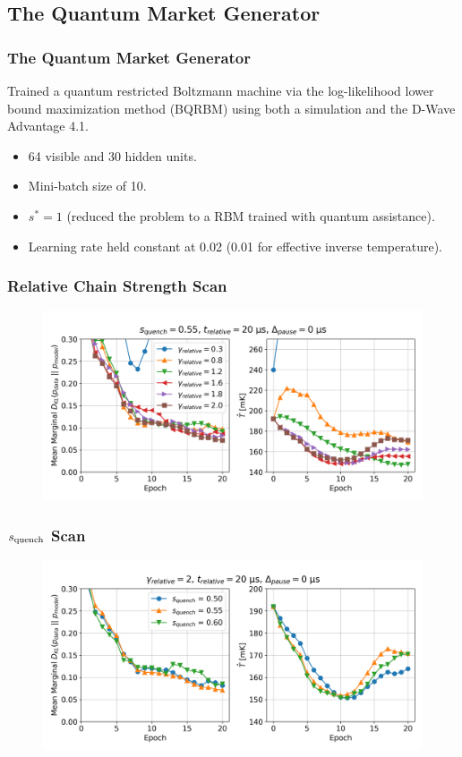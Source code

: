 \documentclass{beamer}
\begin{document}
\subsection{The Quantum Market Generator}
\begin{frame}
    \frametitle{The Quantum Market Generator}
    Trained a quantum restricted Boltzmann machine via the log-likelihood lower bound maximization method (BQRBM) using both a simulation and the D-Wave Advantage 4.1.
    \begin{itemize}
        \item 64 visible and 30 hidden units.
        \item Mini-batch size of 10.
        \item \( s^* = 1 \) (reduced the problem to a RBM trained with quantum assistance).
        \item Learning rate held constant at 0.02 (0.01 for effective inverse temperature).
    \end{itemize}
\end{frame}

\begin{frame}
    \frametitle{Relative Chain Strength Scan}
    \begin{figure}
        \includegraphics[width=1\linewidth]{qbm/log_returns/rcs_comparison.png}
    \end{figure}
\end{frame}

\begin{frame}
    \frametitle{\( s_{\text{quench}} \) Scan}
    \begin{figure}
        \includegraphics[width=1\linewidth]{qbm/log_returns/s_quench_comparison.png}
    \end{figure}
\end{frame}
\end{document}
